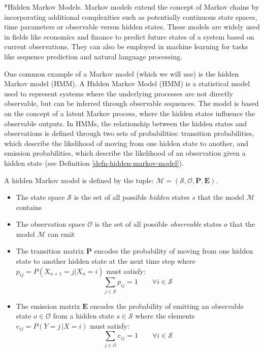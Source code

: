 \documentclass[11pt]{article}
\makeatletter
\theoremstyle{definition}
\renewcommand\subsubsection{\@startsection
	{subsubsection}{2}{0mm}
	{-0.05in}
	{-0.5\baselineskip}
	{\normalfont\normalsize\itshape\bfseries}}
\makeatother
\begin{document}
\subsubsection*{Hidden Markov Models.}
Markov models extend the concept of Markov chains by incorporating additional complexities such as potentially continuous state spaces, time parameters or observable versus hidden states. 
These models are widely used in fields like economics and finance to predict future states of a system based on current observations. 
They can also be employed in machine learning for tasks like sequence prediction and natural language processing. 

One common example of a Markov model (which we will use) is the hidden Markov model (HMM).
A Hidden Markov Model (HMM) is a statistical model used to represent systems where the underlying processes are not directly observable, but can be inferred through observable sequences. 
The model is based on the concept of a latent Markov process, where the hidden states influence the observable outputs. 
In HMMs, the relationship between the hidden states and observations is defined through two sets of probabilities: 
transition probabilities, which describe the likelihood of moving from one hidden state to another, and emission probabilities, 
which describe the likelihood of an observation given a hidden state (see Definition \ref{defn-hidden-markov-model}). 

\begin{definition}\label{defn-hidden-markov-model}
A hidden Markov model is defined by the tuple: $\mathcal{M} = (\mathcal{S},\mathcal{O},\mathbf{P},\mathbf{E})$. 
\begin{itemize}
\item{The state space $\mathcal{S}$ is the set of all possible \textit{hidden} states $s$ that the model $\mathcal{M}$ contains}
\item{The observation space $\mathcal{O}$ is the set of all possible \textit{observable} states $o$ that the model $\mathcal{M}$ can emit}
\item{The transition matrix $\mathbf{P}$ encodes the probability of moving from one hidden state to another hidden state at the next time step where $p_{ij} = P(X_{n+1} = j | X_{n} = i)$ must satisfy:
\begin{equation}
\sum_{j\in\mathcal{S}} p_{ij} = 1\qquad\forall{i\in\mathcal{S}}
\end{equation}}
\item{The emission matrix $\mathbf{E}$ encodes the probability of emitting an observable state
$o\in\mathcal{O}$ from a hidden state $s\in\mathcal{S}$ where the elements $e_{ij} = P(Y = j\,| X = i)$ must satisfy:
\begin{equation}
\sum_{j\in\mathcal{O}} e_{ij} = 1\qquad\forall{i\in\mathcal{S}}
\end{equation}}
\end{itemize}   
\end{definition}
 
\end{document}
